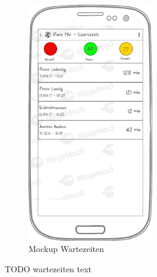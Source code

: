 \begin{figure}[h]
\begin{minipage}{0.49\textwidth}
        \includegraphics[width=0.49\textwidth]{img/mockups/m_wartezeiten.png}
        \caption{Mockup Wartezeiten}
    \end{minipage}
\end{figure}

TODO wartezeiten text

